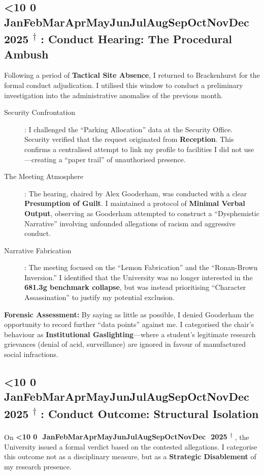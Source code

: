 \documentclass{EMBASSY}
\DeclareRobustCommand{\gmt}[3]{%
    \texorpdfstring{%
        {\color{DateGold}\textbf{%
            \ifnum#1<10 0\fi#1\,\textperiodcentered\,%
            \ifcase#2\or Jan\or Feb\or Mar\or Apr\or May\or Jun\or Jul\or Aug\or Sep\or Oct\or Nov\or Dec\fi
            \,\textperiodcentered\,20#3%
            \textsuperscript{$\dagger$}%
        }}%
    }{%
        (#1/#2/#3)%
    }%
}
\begin{document}
\subsection{\gmt{3}{12}{25}: Conduct Hearing: The Procedural Ambush}
Following a period of \textbf{Tactical Site Absence}, I returned to Brackenhurst for the formal conduct adjudication. I utilised this window to conduct a preliminary investigation into the administrative anomalies of the previous month.

\begin{description}
	\item[Security Confrontation]: I challenged the ``Parking Allocation'' data at the Security Office. Security verified that the request originated from \textbf{Reception}. This confirms a centralised attempt to link my profile to facilities I did not use---creating a ``paper trail'' of unauthorised presence.
	\item[The Meeting Atmosphere]: The hearing, chaired by Alex Gooderham, was conducted with a clear \textbf{Presumption of Guilt}. I maintained a protocol of \textbf{Minimal Verbal Output}, observing as Gooderham attempted to construct a ``Dysphemistic Narrative'' involving unfounded allegations of racism and aggressive conduct.
	\item[Narrative Fabrication]: The meeting focused on the ``Lemon Fabrication'' and the ``Ronan-Brown Inversion.'' I identified that the University was no longer interested in the \textbf{681.3g benchmark collapse}, but was instead prioritising ``Character Assassination'' to justify my potential exclusion.
\end{description}

\noindent\textbf{Forensic Assessment:} By saying as little as possible, I denied Gooderham the opportunity to record further ``data points'' against me. I categorised the chair’s behaviour as \textbf{Institutional Gaslighting}---where a student’s legitimate research grievances (denial of acid, surveillance) are ignored in favour of manufactured social infractions.

\subsection{\gmt{8}{12}{25}: Conduct Outcome: Structural Isolation}
On \gmt{8}{12}{25}, the University issued a formal verdict based on the contested allegations. I categorise this outcome not as a disciplinary measure, but as a \textbf{Strategic Disablement} of my research presence.
\end{document}
